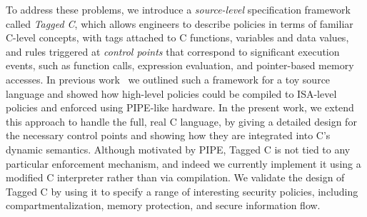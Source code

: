 \documentclass{llncs}
\begin{document}
{  To address these problems, we introduce a \emph{source-level} specification framework called \emph{Tagged C},
  which allows engineers to describe policies in terms of familiar C-level concepts, with tags attached to
  C functions, variables and data values, and rules triggered at \emph{control points} that correspond to
  significant execution events, such as function calls, expression evaluation, and pointer-based memory accesses. 
  In previous work~\cite{Chhak21:Tagine} we outlined such a framework for a toy
  source language and showed how high-level policies could be compiled to ISA-level policies and 
  enforced using PIPE-like hardware.  In the present work, we extend this approach to handle
  the full, real C language, by giving a detailed design for the necessary control points and
  showing how they are integrated into C's dynamic semantics. 
  Although motivated by PIPE, Tagged C is not tied to any particular enforcement mechanism,
  and indeed we currently implement it using a modified C interpreter rather than via compilation.
  We validate the design of Tagged C by using it to specify a range of interesting security policies,
  including compartmentalization, memory protection, and secure information flow.



}
\end{document}
